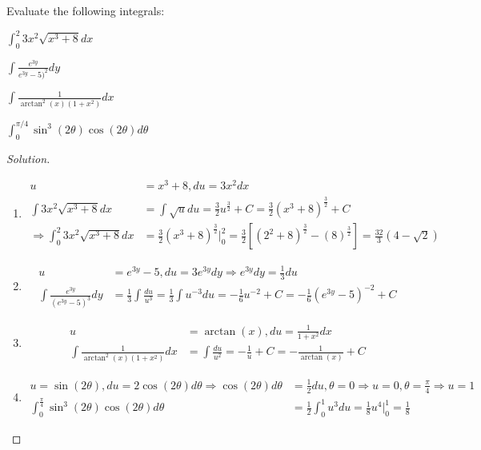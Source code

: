 \documentclass[crop=false,class=article,oneside]{standalone}
\begin{document}
        \begin{problem}
        Evaluate the following integrals:
        \begin{enumerate}
            \begin{multicols}{4}
                \item $\int_{0}^{2}3x^{2}\sqrt{x^{3}+8}dx$
                \item $\int\frac{e^{3y}}{e^{3y}-5)^{2}}dy$
                \item $\int\frac{1}{\arctan^{2}(x)(1+x^{2})}dx$
                \item $\int_{0}^{\pi/4}\sin^{3}(2\theta)\cos(2\theta)d\theta$
            \end{multicols}
        \end{enumerate}
        \end{problem}
        \begin{proof}[Solution]
        \
        \begin{enumerate}
            \item   \begin{align*}
            u&=x^{3}+8, du=3x^{2}dx\\
            \int 3x^{2}\sqrt{x^{3}+8}dx&=\int\sqrt{u}du=\frac{3}{2}u^{\frac{3}{2}}+C=\frac{3}{2}(x^{3}+8)^{\frac{3}{2}}+C\\
            \Rightarrow\int_{0}^{2}3x^{2}\sqrt{x^{3}+8}dx&=\frac{3}{2}(x^{3}+8)^{\frac{3}{2}}\big|_{0}^{2}=\frac{3}{2}[(2^{2}+8)^{\frac{3}{2}}-(8)^{\frac{3}{2}}]=\frac{32}{3}(4-\sqrt{2})
                    \end{align*}
            \item   \begin{align*}
            u&=e^{3y}-5,du=3e^{3y}dy\Rightarrow e^{3y}dy=\frac{1}{3}du\\
            \int\frac{e^{3y}}{(e^{3y}-5)^{3}}dy&=\frac{1}{3}\int\frac{du}{u^{3}}=\frac{1}{3}\int u^{-3}du=-\frac{1}{6}u^{-2}+C=-\frac{1}{6}(e^{3y}-5)^{-2}+C
                    \end{align*}
            \item   \begin{align*}
            u&=\arctan(x),du=\frac{1}{1+x^{2}}dx\\
            \int\frac{1}{\arctan^{2}(x)(1+x^{2})}dx&=\int\frac{du}{u^{2}}=-\frac{1}{u}+C=-\frac{1}{\arctan(x)}+C
                    \end{align*}
            \item   \begin{align*}
            u=\sin(2\theta),du=2\cos(2\theta)d\theta\Rightarrow\cos(2\theta)d\theta&=\frac{1}{2}du,\theta=0\Rightarrow u=0,\theta=\frac{\pi}{4}\Rightarrow u=1\\
            \int_{0}^{\frac{\pi}{4}}\sin^{3}(2\theta)\cos(2\theta)d\theta&=\frac{1}{2}\int_{0}^{1}u^{3}du=\frac{1}{8}u^{4}\big|_{0}^{1}=\frac{1}{8}
                    \end{align*}
        \end{enumerate}
        \end{proof}
\end{document}
